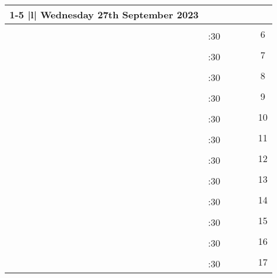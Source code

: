 \documentclass[10pt, a5paper, final, oneside]{memoir}
\newcommand{\grayline}{\arrayrulecolor{lightgray}\cline{1-5}\arrayrulecolor{black}}
\begin{document}
\newpage

\noindent
\begin{tabularx}{\linewidth}{|c|c|X|X|X|c}

    \cline{1-5}
    \multicolumn{5} {|l|} {Wednesday 27th September 2023} \\
    \hline

    & & & && \multirow{2}{*}{6}\\ 
    \grayline
    & :30 & & &&\\ \hline

    & & & && \multirow{2}{*}{7}\\ 
    \grayline
    & :30 & & &&\\ \hline

    & & & && \multirow{2}{*}{8}\\ 
    \grayline
    & :30 & & &&\\ \hline

    & & & && \multirow{2}{*}{9}\\ 
    \grayline
    & :30 & & &&\\ \hline
    
    & & & && \multirow{2}{*}{10}\\ 
    \grayline
    & :30 & & &&\\ \hline

    & & & && \multirow{2}{*}{11}\\ 
    \grayline
    & :30 & & &&\\ \hline

    & & & && \multirow{2}{*}{12}\\ 
    \grayline
    & :30 & & &&\\ \hline

    & & & && \multirow{2}{*}{13}\\ 
    \grayline
    & :30 & & &&\\ \hline

    & & & && \multirow{2}{*}{14}\\ 
    \grayline
    & :30 & & &&\\ \hline
    
    & & & && \multirow{2}{*}{15}\\ 
    \grayline
    & :30 & & &&\\ \hline

    & & & && \multirow{2}{*}{16}\\ 
    \grayline
    & :30 & & &&\\ \hline

    & & & && \multirow{2}{*}{17}\\ 
    \grayline
    & :30 & & &&\\ \hline


\end{tabularx}
\end{document}
